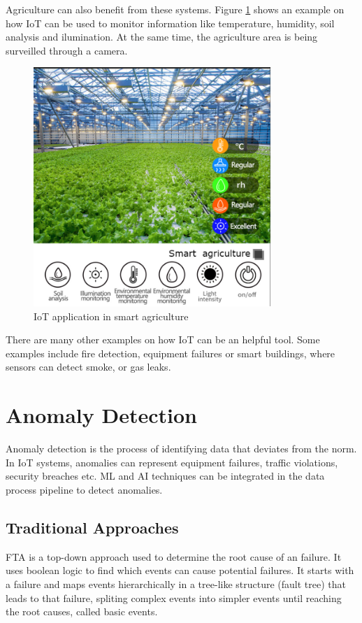 Agriculture can also benefit from these systems. Figure \ref{fig:monitoring:smartagriculture}
shows an example on how \gls{IoT} can be used to monitor information like
temperature, humidity, soil analysis and ilumination. At the same time, the
agriculture area is being surveilled through a camera\cite{hengko_smart_agriculture}.

\begin{figure}[H]
	\centering
	\includegraphics[width=0.8\textwidth, height=0.5\textheight, keepaspectratio]{Chapters/Figures/Monitoring/SmartAgriculture.png}
	\caption{\gls{IoT} application in smart agriculture\cite{hengko_smart_agriculture}}
	\label{fig:monitoring:smartagriculture}
\end{figure}

There are many other examples on how \gls{IoT} can be an helpful tool. Some
examples include fire detection, equipment failures or  smart buildings, where
sensors can detect smoke, or gas leaks.

\section{Anomaly Detection}
Anomaly detection is the process of identifying data that deviates from the norm.
In \gls{IoT} systems, anomalies can represent equipment failures, traffic violations,
security breaches etc. \gls{ML} and \gls{AI} techniques
can be integrated in the data process pipeline to detect anomalies.

\subsection{Traditional Approaches}
\gls{FTA} is a top-down approach used to determine the root cause of an failure.
It uses boolean logic to find which events can cause potential failures. It
starts with a failure and maps events hierarchically in a tree-like structure
(fault tree) that leads to that failure, spliting complex events into simpler
events until reaching the root causes, called basic events\cite{IBMFTA}.

